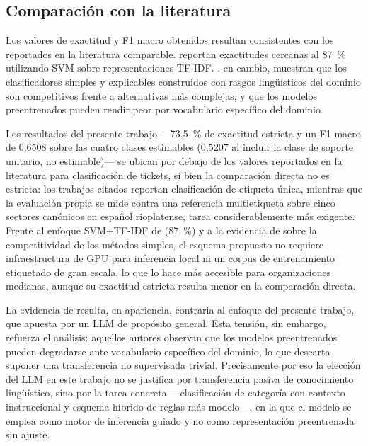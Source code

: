 \subsection{Comparación con la literatura}\label{subsec:comparacion-literatura}

Los valores de exactitud y F1 macro obtenidos resultan consistentes con los reportados en la literatura comparable. \textcite{Paramesh2019_it_service_desk} reportan exactitudes cercanas al 87~\% utilizando SVM sobre representaciones TF-IDF. \textcite{Revina2020_it_tickets}, en cambio, muestran que los clasificadores simples y explicables construidos con rasgos lingüísticos del dominio son competitivos frente a alternativas más complejas, y que los modelos preentrenados pueden rendir peor por vocabulario específico del dominio.

Los resultados del presente trabajo ---73,5~\% de exactitud estricta y un F1 macro de 0,6508 sobre las cuatro clases estimables (0,5207 al incluir la clase de soporte unitario, no estimable)--- se ubican por debajo de los valores reportados en la literatura para clasificación de tickets, si bien la comparación directa no es estricta: los trabajos citados reportan clasificación de etiqueta única, mientras que la evaluación propia se mide contra una referencia multietiqueta sobre cinco sectores canónicos en español rioplatense, tarea considerablemente más exigente. Frente al enfoque SVM+TF-IDF de \textcite{Paramesh2019_it_service_desk} (87~\%) y a la evidencia de \textcite{Revina2020_it_tickets} sobre la competitividad de los métodos simples, el esquema propuesto no requiere infraestructura de GPU para inferencia local ni un corpus de entrenamiento etiquetado de gran escala, lo que lo hace más accesible para organizaciones medianas, aunque su exactitud estricta resulta menor en la comparación directa.

La evidencia de \textcite{Revina2020_it_tickets} resulta, en apariencia, contraria al enfoque del presente trabajo, que apuesta por un LLM de propósito general. Esta tensión, sin embargo, refuerza el análisis: aquellos autores observan que los modelos preentrenados pueden degradarse ante vocabulario específico del dominio, lo que descarta suponer una transferencia no supervisada trivial. Precisamente por eso la elección del LLM en este trabajo no se justifica por transferencia pasiva de conocimiento lingüístico, sino por la tarea concreta ---clasificación de categoría con contexto instruccional y esquema híbrido de reglas más modelo---, en la que el modelo se emplea como motor de inferencia guiado y no como representación preentrenada sin ajuste.

